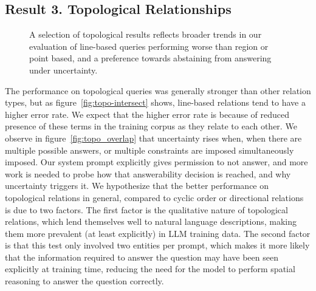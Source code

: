 \subsection{Result 3. Topological Relationships}

\begin{figure}[h]
    \centering
    \hfill
    \hfill
    \caption{A selection of topological results reflects broader trends in our evaluation of line-based queries performing worse than region or point based, and a preference towards abstaining from answering under uncertainty.}
    \label{fig:topo_plots}
\end{figure}

The performance on topological queries was generally stronger than other relation types, but as figure~\ref{fig:topo-intersect} shows, line-based relations tend to have a higher error rate. 
We expect that the higher error rate is because of reduced presence of these terms in the training corpus as they relate to each other. 
We observe in figure~\ref{fig:topo_overlap} that uncertainty rises when, when there are multiple possible answers, or multiple constraints are imposed simultaneously imposed.
Our system prompt explicitly gives permission to not answer, and more work is needed to probe how that answerability decision is reached, and why uncertainty triggers it. 
We hypothesize that the better performance on topological relations in general, compared to cyclic order or directional relations is due to two factors.
The first factor is the qualitative nature of topological relations, which lend themselves well to natural language descriptions, making them more prevalent (at least explicitly) in LLM training data.
The second factor is that this test only involved two entities per prompt, which makes it more likely that the information required to answer the question may have been seen explicitly at training time, reducing the need for the model to perform spatial reasoning to answer the question correctly.



